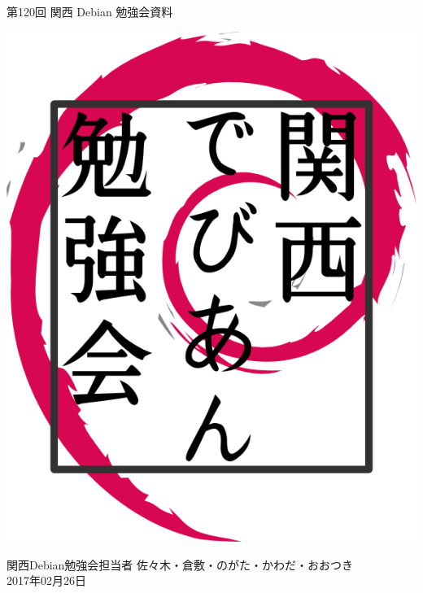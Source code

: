 \documentclass[mingoth,a4paper]{jsarticle}
\newcommand{\debmtgyear}{2017}
\newcommand{\debmtgdate}{26}
\newcommand{\debmtgmonth}{02}
\newcommand{\debmtgnumber}{120}
\begin{document}
\begin{titlepage}


  第\debmtgnumber{}回 関西 Debian 勉強会資料

  \vspace{2cm}

  \begin{center}
    \includegraphics{image200802/kansaidebianlogo.png}
  \end{center}

  \begin{flushright}
    \hfill{}関西Debian勉強会担当者 佐々木・倉敷・のがた・かわだ・おおつき \\
    \hfill{}\debmtgyear{}年\debmtgmonth{}月\debmtgdate{}日
  \end{flushright}

  \thispagestyle{empty}
\end{titlepage}

\end{document}
